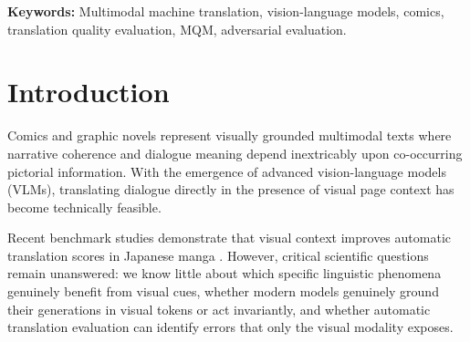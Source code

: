 \documentclass[11pt,a4paper]{article}
\begin{document}
\newpage

\begin{abstract}
\textbf{Context:} Vision-language models (VLMs) can now translate dialogue directly from comic and manga pages. \\
\textbf{Gap:} Prior work demonstrates that visual context improves automatic translation scores for manga, but leaves unaddressed where and why the image matters, whether models genuinely ground their decisions in visual scenes, and whether standard automatic evaluation can detect image-dependent translation errors. \\
\textbf{Method:} We introduce an openly released English Golden Age comic dataset annotated for text--image relations (Martinec \& Salway, 2005) and Multidimensional Quality Metrics (MQM) with custom image-dependent error tags. We benchmark open and proprietary VLMs (\textit{Qwen2.5-VL-7B}, \textit{Llama-3.2-11B-Vision}, \textit{GPT-4o}) across four controlled visual conditions: text-only, text + correct image, text + mismatched image (adversarial), and text + noise image. We systematically compare cascaded pipelines (Detection $\to$ OCR $\to$ MT) against end-to-end multimodal VLMs, and benchmark automated metrics (COMET-Kiwi, chrF++) and LLM judges against human MQM. \\
\textbf{Main Findings:} [Empirical findings from cluster benchmark]. \\
\textbf{Implications:} Provides concrete guidance on multimodal translation pipelines, adversarial evaluation protocols, and metric limitations for visually grounded texts.
\end{abstract}

\noindent\textbf{Keywords:} Multimodal machine translation, vision-language models, comics, translation quality evaluation, MQM, adversarial evaluation.

\section{Introduction}

Comics and graphic novels represent visually grounded multimodal texts where narrative coherence and dialogue meaning depend inextricably upon co-occurring pictorial information. With the emergence of advanced vision-language models (VLMs), translating dialogue directly in the presence of visual page context has become technically feasible.

Recent benchmark studies demonstrate that visual context improves automatic translation scores in Japanese manga \cite{lippmann2025context}. However, critical scientific questions remain unanswered: we know little about which specific linguistic phenomena genuinely benefit from visual cues, whether modern models genuinely ground their generations in visual tokens or act invariantly, and whether automatic translation evaluation can identify errors that only the visual modality exposes.
\end{document}
